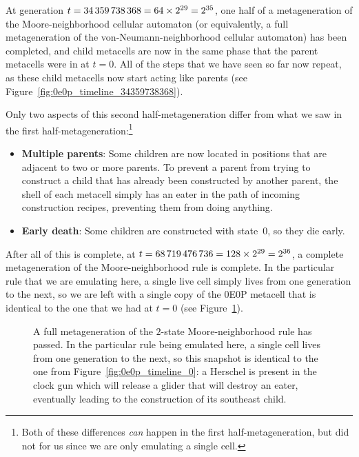 At generation $t = 34{\,}359{\,}738{\,}368 = 64 \times 2^{29} = 2^{35}$, one half of a metageneration of the Moore-neighborhood cellular automaton (or equivalently, a full metageneration of the von-Neumann-neighborhood cellular automaton) has been completed, and child metacells are now in the same phase that the parent metacells were in at $t = 0$. All of the steps that we have seen so far now repeat, as these child metacells now start acting like parents (see Figure~\ref{fig:0e0p_timeline_34359738368}).

Only two aspects of this second half-metageneration differ from what we saw in the first half-metageneration:\footnote{Both of these differences \emph{can} happen in the first half-metageneration, but did not for us since we are only emulating a single cell.}\smallskip

\begin{itemize}
	\item \textbf{Multiple parents}: Some children are now located in positions that are adjacent to two or more parents. To prevent a parent from trying to construct a child that has already been constructed by another parent, the shell of each metacell simply has an eater in the path of incoming construction recipes, preventing them from doing anything.\smallskip
	
	\item \textbf{Early death}: Some children are constructed with state~$0$, so they die early.\smallskip
\end{itemize}

After all of this is complete, at $t = 68{\,}719{\,}476{\,}736 = 128 \times 2^{29} = 2^{36}$, a complete metageneration of the Moore-neighborhood rule is complete. In the particular rule that we are emulating here, a single live cell simply lives from one generation to the next, so we are left with a single copy of the 0E0P metacell that is identical to the one that we had at $t = 0$ (see Figure~\ref{fig:0e0p_timeline_68719476736}).

\begin{figure}[!htb]
	\centering
	\caption{A full metageneration of the $2$-state Moore-neighborhood rule has passed. In the particular rule being emulated here, a single cell lives from one generation to the next, so this snapshot is identical to the one from Figure~\ref{fig:0e0p_timeline_0}: a Herschel is present in the clock gun which will release a glider that will destroy an eater, eventually leading to the construction of its southeast child.}
	\label{fig:0e0p_timeline_68719476736}
\end{figure}


